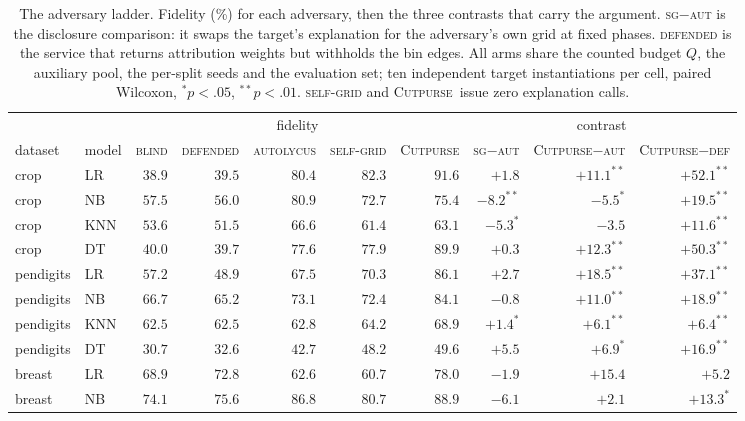 \documentclass[sigconf,anonymous,review]{acmart}
\newcommand{\sys}{\textsc{Cutpurse}}
\begin{document}
\begin{table}[t]
\centering
\caption{The adversary ladder. Fidelity (\%) for each adversary, then the three contrasts that carry
the argument. \textsc{sg}$-$\textsc{aut} is the disclosure comparison: it swaps the target's
explanation for the adversary's own grid at fixed phases. \textsc{defended} is the service that returns attribution weights but withholds the bin
edges. All arms share the counted budget $Q$, the auxiliary pool, the per-split seeds and the
evaluation set; ten independent target instantiations per cell, paired Wilcoxon, $^{*}p{<}.05$,
$^{**}p{<}.01$. \textsc{self-grid} and \sys\ issue zero explanation calls.}
\label{tab:ladder}
\begin{tabular}{llrrrrrrrr}
\toprule
& & \multicolumn{5}{c}{fidelity} & \multicolumn{3}{c}{contrast} \\
\cmidrule(lr){3-7}\cmidrule(lr){8-10}
dataset & model & \textsc{blind} & \textsc{defended} & \textsc{autolycus} & \textsc{self-grid}
& \sys & \textsc{sg}$-$\textsc{aut} & \sys$-$\textsc{aut} & \sys$-$\textsc{def} \\
\midrule
crop       & LR   & $38.9$ & $39.5$ & $80.4$ & $82.3$ & $91.6$ & $+1.8$ & $+11.1^{**}$ & $+52.1^{**}$ \\
crop       & NB   & $57.5$ & $56.0$ & $80.9$ & $72.7$ & $75.4$ & $-8.2^{**}$ & $-5.5^{*}$ & $+19.5^{**}$ \\
crop       & KNN  & $53.6$ & $51.5$ & $66.6$ & $61.4$ & $63.1$ & $-5.3^{*}$ & $-3.5$ & $+11.6^{**}$ \\
crop       & DT   & $40.0$ & $39.7$ & $77.6$ & $77.9$ & $89.9$ & $+0.3$ & $+12.3^{**}$ & $+50.3^{**}$ \\
\addlinespace
pendigits  & LR   & $57.2$ & $48.9$ & $67.5$ & $70.3$ & $86.1$ & $+2.7$ & $+18.5^{**}$ & $+37.1^{**}$ \\
pendigits  & NB   & $66.7$ & $65.2$ & $73.1$ & $72.4$ & $84.1$ & $-0.8$ & $+11.0^{**}$ & $+18.9^{**}$ \\
pendigits  & KNN  & $62.5$ & $62.5$ & $62.8$ & $64.2$ & $68.9$ & $+1.4^{*}$ & $+6.1^{**}$ & $+6.4^{**}$ \\
pendigits  & DT   & $30.7$ & $32.6$ & $42.7$ & $48.2$ & $49.6$ & $+5.5$ & $+6.9^{*}$ & $+16.9^{**}$ \\
\addlinespace
breast     & LR   & $68.9$ & $72.8$ & $62.6$ & $60.7$ & $78.0$ & $-1.9$ & $+15.4$ & $+5.2$ \\
breast     & NB   & $74.1$ & $75.6$ & $86.8$ & $80.7$ & $88.9$ & $-6.1$ & $+2.1$ & $+13.3^{*}$ \\

\end{tabular}
\end{table}
\end{document}
